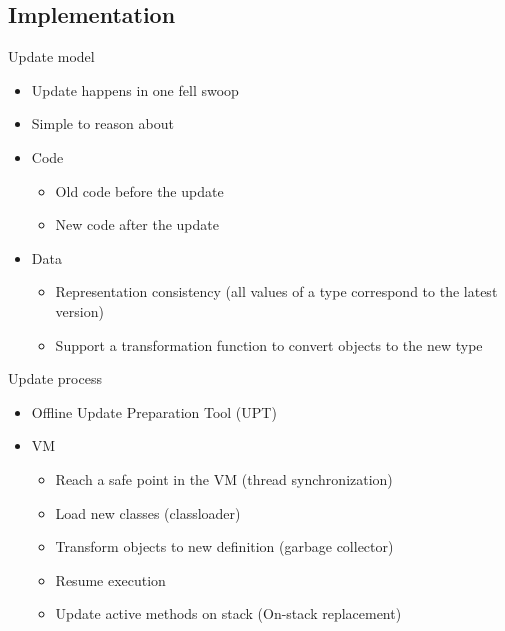 

\subsection{Implementation}
\ShowTOC

\begin{frame}{Update model}%
\begin{itemize}
\item Update happens in one fell swoop
\item Simple to reason about
\item Code
  \begin{itemize}
  \item Old code before the update
  \item New code after the update
  \end{itemize}
\item Data
  \begin{itemize}
  \item Representation consistency (all values of a type correspond to the
        latest version)
  \item Support a transformation function to convert objects to the new
        type
  \end{itemize}
\end{itemize}
\end{frame}

\begin{frame}[t,fragile]{Update process}%
\JvolveTimeLine{}{}{}{}{}
\begin{itemize}
\item Offline Update Preparation Tool (UPT)
\item \DSU{} VM
  \begin{itemize}
  \item Reach a safe point in the VM (thread synchronization)
  \item Load new classes (classloader)
  \item Transform objects to new definition (garbage collector)
  \item Resume execution
  \item<2-> Update active methods on stack (On-stack replacement)
  \end{itemize}
\end{itemize}
\end{frame}


